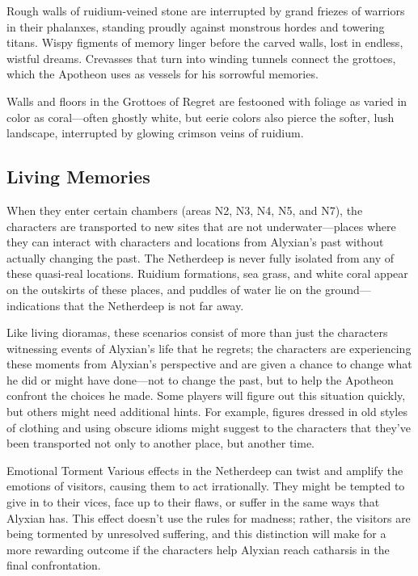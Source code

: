 \documentclass[10pt,a4paper,twoside,twocolumn,openany,nodeprecatedcode]{dndbook}
\begin{document}
Rough walls of ruidium-veined stone are interrupted by grand friezes of warriors in their phalanxes, standing proudly against monstrous hordes and towering titans. Wispy figments of memory linger before the carved walls, lost in endless, wistful dreams. Crevasses that turn into winding tunnels connect the grottoes, which the Apotheon uses as vessels for his sorrowful memories.

Walls and floors in the Grottoes of Regret are festooned with foliage as varied in color as coral—often ghostly white, but eerie colors also pierce the softer, lush landscape, interrupted by glowing crimson veins of ruidium.

\subsection{Living Memories}
When they enter certain chambers (areas N2, N3, N4, N5, and N7), the characters are transported to new sites that are not underwater—places where they can interact with characters and locations from Alyxian's past without actually changing the past. The Netherdeep is never fully isolated from any of these quasi-real locations. Ruidium formations, sea grass, and white coral appear on the outskirts of these places, and puddles of water lie on the ground—indications that the Netherdeep is not far away.

Like living dioramas, these scenarios consist of more than just the characters witnessing events of Alyxian's life that he regrets; the characters are experiencing these moments from Alyxian's perspective and are given a chance to change what he did or might have done—not to change the past, but to help the Apotheon confront the choices he made. Some players will figure out this situation quickly, but others might need additional hints. For example, figures dressed in old styles of clothing and using obscure idioms might suggest to the characters that they've been transported not only to another place, but another time.

\begin{DndSidebar}[float=!b]{Emotional Torment}
Various effects in the Netherdeep can twist and amplify the emotions of visitors, causing them to act irrationally. They might be tempted to give in to their vices, face up to their flaws, or suffer in the same ways that Alyxian has. This effect doesn't use the rules for madness; rather, the visitors are being tormented by unresolved suffering, and this distinction will make for a more rewarding outcome if the characters help Alyxian reach catharsis in the final confrontation.



\end{DndSidebar}
\end{document}
